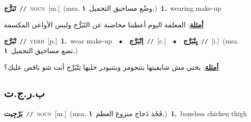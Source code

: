 \documentclass[10pt,a4paper,twoside]{article} %
\begin{document}
\begin{multicols}{2}
{\setlength\topsep{0pt}\textbf{\foreignlanguage{arabic}{تَبَرُّج}}\ {\color{gray}\texttt{//}\color{black}}\ \textsc{noun}\ [m.]\ \color{gray}(msa. \foreignlanguage{arabic}{وضْع مساحيق التجميل}~\foreignlanguage{arabic}{\textbf{١.}})\color{black}\ \textbf{1.}~wearing make-up\  \begin{flushright}\color{gray}\foreignlanguage{arabic}{\textbf{\underline{\foreignlanguage{arabic}{أمثلة}}}: المعلمة اليوم أعطتنا محاضىة عن التَبَرُّج ولبس الأواعي المكسمة}\end{flushright}\color{black}} \vspace{2mm}

{\setlength\topsep{0pt}\textbf{\foreignlanguage{arabic}{تْبَرَّج}}\ {\color{gray}\texttt{//}\color{black}}\ \textsc{verb}\ [p.]\ \textbf{1.}~wear make-up\ \ $\bullet$\ \ \setlength\topsep{0pt}\textbf{\foreignlanguage{arabic}{اِتْبَرَّج}}\ {\color{gray}\texttt{//}\color{black}}\ [c.]\ \ $\bullet$\ \ \setlength\topsep{0pt}\textbf{\foreignlanguage{arabic}{يِتْبَرَّج}}\ {\color{gray}\texttt{//}\color{black}}\ [i.]\ \color{gray}(msa. \foreignlanguage{arabic}{تضع مساحيق التجميل}~\foreignlanguage{arabic}{\textbf{١.}})\color{black}\  \begin{flushright}\color{gray}\foreignlanguage{arabic}{\textbf{\underline{\foreignlanguage{arabic}{أمثلة}}}: يختي مش شايفيتها بتتحومر وبتتبودر خليها تِتْبَرَّج أنت شو ناقص عليكِ؟}\end{flushright}\color{black}} \vspace{2mm}

\vspace{-3mm}
\subsection*{\color{blue}\foreignlanguage{arabic}{ب.ر.ج.ت}\color{blue}{ (ntws)}} 

{\setlength\topsep{0pt}\textbf{\foreignlanguage{arabic}{بَرْجِيت}}\ {\color{gray}\texttt{//}\color{black}}\ \textsc{noun}\ [m.]\ \color{gray}(msa. \foreignlanguage{arabic}{فَخَذ دَجاج منزوع العظم}~\foreignlanguage{arabic}{\textbf{١.}})\color{black}\ \textbf{1.}~boneless chicken thigh\ } \vspace{2mm}


\end{multicols}
\end{document}
